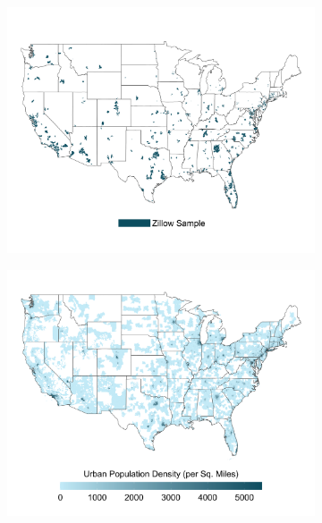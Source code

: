 \documentclass{article}
\begin{document}
\clearpage
\begin{figure}
	\caption{Comparison Between Zillow Sample and Population Density in CBSAs}
	\begin{subfigure}[b]{\textwidth}\centering
		\includegraphics[width = .9\textwidth]{../../analysis/descriptive/output/sample_map.png}
	\end{subfigure}
	\quad 
	\begin{subfigure}[b]{\textwidth}\centering
		\includegraphics[width = .9\textwidth]{../../analysis/descriptive/output/popurban_density_map.png}
	\end{subfigure}
\end{figure}
\end{document}

